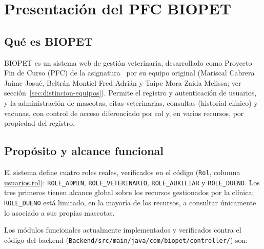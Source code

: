 \chapter{Presentaci\'on del PFC BIOPET}
\label{cap:presentacion-pfc}

\section{Qu\'e es BIOPET}
\label{sec:que-es-biopet}

BIOPET es un sistema web de gesti\'on veterinaria, desarrollado como
Proyecto Fin de Curso (PFC) de la asignatura \asignatura\ por su equipo
original (Mariscal Cabrera Jaime Josu\'e, Beltr\'an Montiel Fred Adri\'an y
Taipe Mora Zaida Melissa; ver secci\'on~\ref{sec:distincion-equipos}).
Permite el registro y autenticaci\'on de usuarios, y la administraci\'on de
mascotas, citas veterinarias, consultas (historial cl\'inico) y vacunas,
con control de acceso diferenciado por rol y, en varios recursos, por
propiedad del registro.

\section{Prop\'osito y alcance funcional}
\label{sec:proposito-alcance}

El sistema define cuatro roles reales, verificados en el c\'odigo
(\texttt{Rol}, columna \url{usuarios.rol}): \texttt{ROLE\_ADMIN},
\texttt{ROLE\_VETERINARIO}, \texttt{ROLE\_AUXILIAR} y \texttt{ROLE\_DUENO}.
Los tres primeros tienen alcance global sobre los recursos gestionados por
la cl\'inica; \texttt{ROLE\_DUENO} est\'a limitado, en la mayor\'ia de los
recursos, a consultar \'unicamente lo asociado a sus propias mascotas.

Los m\'odulos funcionales actualmente implementados y verificados contra el
c\'odigo del backend (\texttt{Backend/src/main/java/com/biopet/controller/})
son:

